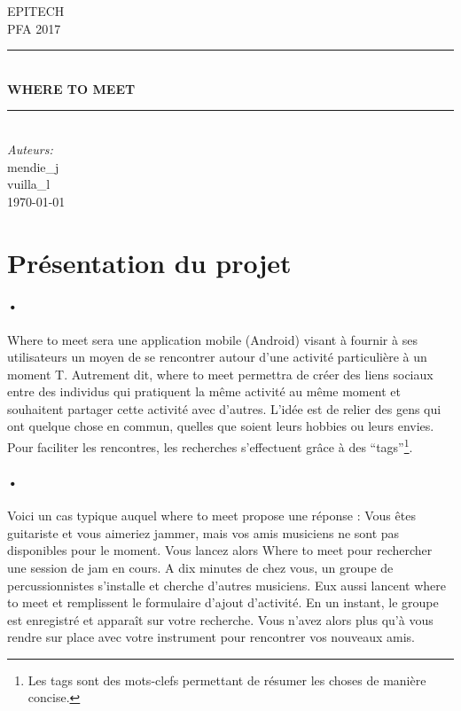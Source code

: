 \documentclass[pdftex,12pt,a4paper]{article}
\newcommand{\HRule}{\rule{\linewidth}{0.5mm}}
\begin{document}
\begin{titlepage}
\begin{center}

\textsc{\LARGE EPITECH}\\[1.5cm]
\textsc{\Large PFA 2017}\\[0.5cm]
\HRule \\[0.4cm]
{\huge \bfseries WHERE TO MEET \\[0.4cm]}
\HRule \\[1.5cm]

\emph{Auteurs:}\\
mendie\_j \\
vuilla\_l \\

\vfill
{\large \today}

\end{center}
\end{titlepage}
\section{Pr\'esentation du projet}
\paragraph{•}
Where to meet sera une application mobile (Android) visant \`a fournir \`a ses  utilisateurs un moyen de se rencontrer autour d’une activit\'e particuli\`ere à un moment T.
Autrement dit, where to meet permettra de cr\'eer des liens sociaux entre des individus qui pratiquent la m\^eme activit\'e au m\^eme moment et souhaitent partager cette activit\'e avec d’autres. L'id\'ee est de relier des gens qui ont quelque chose en commun, quelles que soient leurs hobbies ou leurs envies. 
Pour faciliter les rencontres, les recherches s’effectuent gr\^ace à des “tags”\footnote{Les tags sont des mots-clefs permettant de r\'esumer les choses de manière concise.
}.

\paragraph{•}
Voici un cas typique auquel where to meet propose une r\'eponse :
Vous \^etes guitariste et vous aimeriez jammer, mais vos amis musiciens ne sont pas disponibles pour le moment. Vous lancez alors Where to meet pour rechercher une session de jam en cours. A dix minutes de chez vous, un groupe de percussionnistes s'installe et cherche d’autres musiciens. Eux aussi lancent where to meet et remplissent le formulaire d’ajout d'activit\'e. En un instant, le groupe est enregistr\'e et appara\^it sur votre recherche. Vous n’avez alors plus qu’à vous rendre sur place avec votre instrument pour rencontrer vos nouveaux amis.
\end{document}
